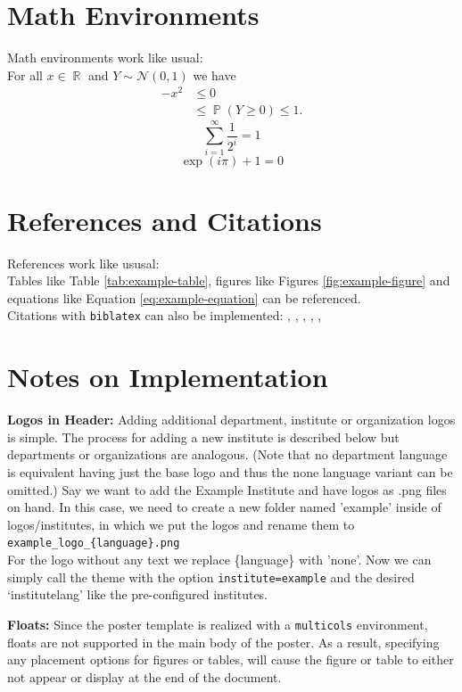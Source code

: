 \documentclass{IMW_poster}
\DeclareMathOperator{\R}{\mathbb{R}}
\DeclareMathOperator{\Prob}{\mathbb{P}}
\begin{document}
\section{Math Environments}
Math environments work like usual:\\
For all $x \in \R$ and $Y \sim \mathcal{N}(0, 1)$ we have
\begin{align*}
    - x^2   &\leq 0 \\
            &\leq \Prob \left( Y \geq 0 \right) \leq 1.
\end{align*}
\begin{equation*}
    \sum_{i=1}^{\infty} \frac{1}{2^i} = 1
\end{equation*}
\begin{equation}\label{eq:example-equation}
    \exp\left( i \pi \right) + 1 = 0
\end{equation}


\section{References and Citations}
References work like ususal:\\
Tables like Table \ref{tab:example-table}, figures like Figures 
\ref{fig:example-figure} and equations like Equation 
\eqref{eq:example-equation} can be referenced.\\
Citations with \texttt{biblatex} can also be implemented: \cite{einstein},
\cite{dirac}, \cite{knuth-acp}, \cite{knuth-fa}, \cite{knuthwebsite}, 
\cite{ctan}


\section{Notes on Implementation}\label{sec:implementation}
\textbf{Logos in Header:} Adding additional department, institute or 
organization logos is simple. The process for adding a new institute is 
described below but departments or organizations are analogous. (Note that 
no department language is equivalent having just the base logo and thus the 
none language variant can be omitted.) Say we want to add the Example 
Institute and have logos as .png files on hand. In this case, we need to 
create a new folder named 'example' inside of logos/institutes, in which we 
put the logos and rename them to \texttt{example\_logo\_\{language\}.png}\\
For the logo without any text we replace \{language\} with 'none'.
Now we can simply call the theme with the option \texttt{institute=example}
and the desired `institutelang' like the pre-configured institutes.

\textbf{Floats:} Since the poster template is realized with a
\texttt{multicols} environment, floats are not supported in the main body of
the poster. As a result, specifying any placement options for figures or 
tables, will cause the figure or table to either not appear or display at the 
end of the document.


\printbibliography
\end{document}
